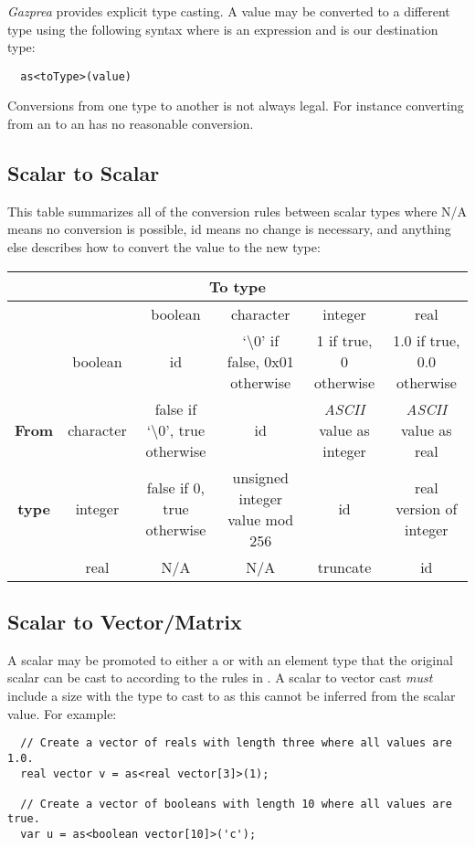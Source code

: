\documentclass[../gazprea.tex]{subfiles}
\begin{document}
\textit{Gazprea} provides explicit type casting. A value may be converted to a different type using
the following syntax where  is an expression and  is our destination type:
\begin{lstlisting}
  as<toType>(value)
\end{lstlisting}

Conversions from one type to another is not always legal. For instance converting from an
  to an  has no reasonable conversion.

\subsection{Scalar to Scalar}
\label{ssec:typeCasting_stos}
This table summarizes all of the conversion rules between scalar types where N/A means no conversion
is possible, id means no change is necessary, and anything else describes how to convert the value
to the new type:
\begin{center}
\begin{tabular}{| c | c | c | c | c | c |}
  \hline
  \multicolumn{6}{c}{\textbf{To type}} \\ \hline
    && \multicolumn{1}{c}{boolean} & \multicolumn{1}{c}{character}
    & \multicolumn{1}{c}{integer} & \multicolumn{1}{c}{real} \\
    \cline{2-6}
  & boolean & id & `\textbackslash0' if false, 0x01 otherwise & 1 if true, 0 otherwise
    & 1.0 if true, 0.0 otherwise \\ \cline{2-6}
  \textbf{From} & character & false if `\textbackslash0', true otherwise & id
    & \textit{ASCII} value as integer & \textit{ASCII} value as real \\ \cline{2-6}
  \textbf{type} & integer & false if 0, true otherwise & unsigned integer value mod 256 & id
    & real version of integer \\ \cline{2-6}
  & real & N/A & N/A & truncate & id \\ \hline
\end{tabular}
\end{center}

\subsection{Scalar to Vector/Matrix}
\label{ssec:typecasting_stovm}
\label{ssec:typecasting_stov}
\label{ssec:typecasting_stom}
A scalar may be promoted to either a  or  with an element type that the
original scalar can be cast to according to the rules in . A scalar
to vector cast \textit{must} include a size with the type to cast to as this cannot be inferred from
the scalar value. For example:
\begin{lstlisting}
  // Create a vector of reals with length three where all values are 1.0.
  real vector v = as<real vector[3]>(1);

  // Create a vector of booleans with length 10 where all values are true.
  var u = as<boolean vector[10]>('c');
\end{lstlisting}
\end{document}
